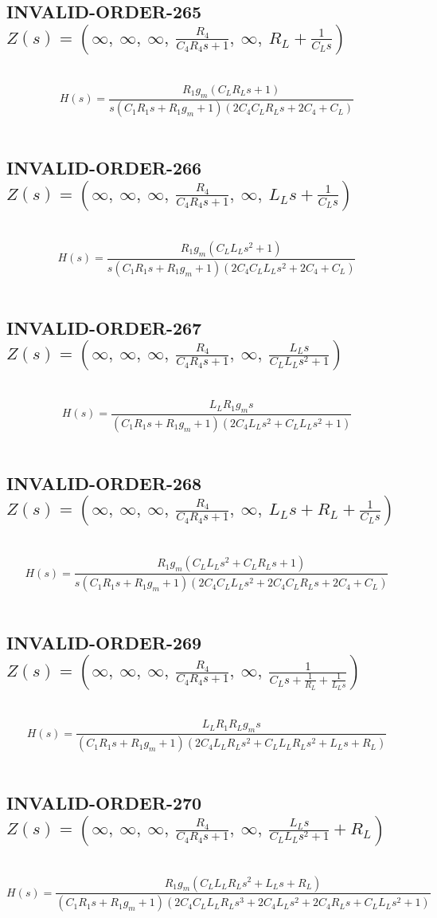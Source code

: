 \documentclass{article}
\begin{document}
\subsection{INVALID-ORDER-265 $Z(s) = \left( \infty, \  \infty, \  \infty, \  \frac{R_{4}}{C_{4} R_{4} s + 1}, \  \infty, \  R_{L} + \frac{1}{C_{L} s}\right)$ } \ 
\textbf{\[H(s) = \frac{R_{1} g_{m} \left(C_{L} R_{L} s + 1\right)}{s \left(C_{1} R_{1} s + R_{1} g_{m} + 1\right) \left(2 C_{4} C_{L} R_{L} s + 2 C_{4} + C_{L}\right)}\] } \ 
\subsection{INVALID-ORDER-266 $Z(s) = \left( \infty, \  \infty, \  \infty, \  \frac{R_{4}}{C_{4} R_{4} s + 1}, \  \infty, \  L_{L} s + \frac{1}{C_{L} s}\right)$ } \ 
\textbf{\[H(s) = \frac{R_{1} g_{m} \left(C_{L} L_{L} s^{2} + 1\right)}{s \left(C_{1} R_{1} s + R_{1} g_{m} + 1\right) \left(2 C_{4} C_{L} L_{L} s^{2} + 2 C_{4} + C_{L}\right)}\] } \ 
\subsection{INVALID-ORDER-267 $Z(s) = \left( \infty, \  \infty, \  \infty, \  \frac{R_{4}}{C_{4} R_{4} s + 1}, \  \infty, \  \frac{L_{L} s}{C_{L} L_{L} s^{2} + 1}\right)$ } \ 
\textbf{\[H(s) = \frac{L_{L} R_{1} g_{m} s}{\left(C_{1} R_{1} s + R_{1} g_{m} + 1\right) \left(2 C_{4} L_{L} s^{2} + C_{L} L_{L} s^{2} + 1\right)}\] } \ 
\subsection{INVALID-ORDER-268 $Z(s) = \left( \infty, \  \infty, \  \infty, \  \frac{R_{4}}{C_{4} R_{4} s + 1}, \  \infty, \  L_{L} s + R_{L} + \frac{1}{C_{L} s}\right)$ } \ 
\textbf{\[H(s) = \frac{R_{1} g_{m} \left(C_{L} L_{L} s^{2} + C_{L} R_{L} s + 1\right)}{s \left(C_{1} R_{1} s + R_{1} g_{m} + 1\right) \left(2 C_{4} C_{L} L_{L} s^{2} + 2 C_{4} C_{L} R_{L} s + 2 C_{4} + C_{L}\right)}\] } \ 
\subsection{INVALID-ORDER-269 $Z(s) = \left( \infty, \  \infty, \  \infty, \  \frac{R_{4}}{C_{4} R_{4} s + 1}, \  \infty, \  \frac{1}{C_{L} s + \frac{1}{R_{L}} + \frac{1}{L_{L} s}}\right)$ } \ 
\textbf{\[H(s) = \frac{L_{L} R_{1} R_{L} g_{m} s}{\left(C_{1} R_{1} s + R_{1} g_{m} + 1\right) \left(2 C_{4} L_{L} R_{L} s^{2} + C_{L} L_{L} R_{L} s^{2} + L_{L} s + R_{L}\right)}\] } \ 
\subsection{INVALID-ORDER-270 $Z(s) = \left( \infty, \  \infty, \  \infty, \  \frac{R_{4}}{C_{4} R_{4} s + 1}, \  \infty, \  \frac{L_{L} s}{C_{L} L_{L} s^{2} + 1} + R_{L}\right)$ } \ 
\textbf{\[H(s) = \frac{R_{1} g_{m} \left(C_{L} L_{L} R_{L} s^{2} + L_{L} s + R_{L}\right)}{\left(C_{1} R_{1} s + R_{1} g_{m} + 1\right) \left(2 C_{4} C_{L} L_{L} R_{L} s^{3} + 2 C_{4} L_{L} s^{2} + 2 C_{4} R_{L} s + C_{L} L_{L} s^{2} + 1\right)}\] } \ 
\end{document}
